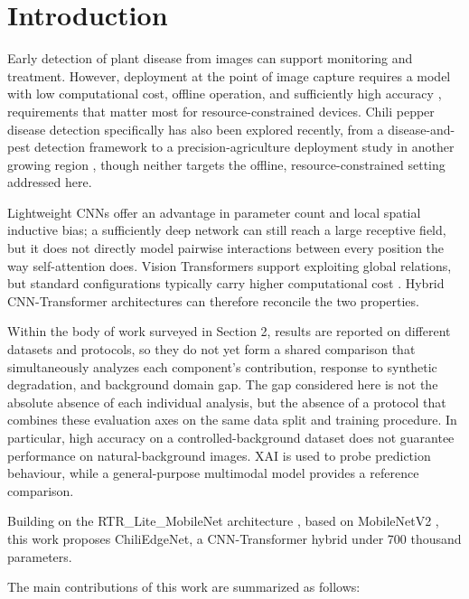 \FloatBarrier

\section{Introduction}\label{introduction}

Early detection of plant disease from images can support monitoring and treatment. However, deployment at the point of image capture requires a model with low computational cost, offline operation, and sufficiently high accuracy \cite{joseph2024,maurya2024,duhan2025}, requirements that matter most for resource-constrained devices. Chili pepper disease detection specifically has also been explored recently, from a disease-and-pest detection framework \cite{kanaparthi2026} to a precision-agriculture deployment study in another growing region \cite{odounfa2025}, though neither targets the offline, resource-constrained setting addressed here.

Lightweight CNNs offer an advantage in parameter count and local spatial inductive bias; a sufficiently deep network can still reach a large receptive field, but it does not directly model pairwise interactions between every position the way self-attention does. Vision Transformers support exploiting global relations, but standard configurations typically carry higher computational cost \cite{gole2023,li2023}. Hybrid CNN-Transformer architectures can therefore reconcile the two properties.

Within the body of work surveyed in Section 2, results are reported on different datasets and protocols, so they do not yet form a shared comparison that simultaneously analyzes each component's contribution, response to synthetic degradation, and background domain gap. The gap considered here is not the absolute absence of each individual analysis, but the absence of a protocol that combines these evaluation axes on the same data split and training procedure. In particular, high accuracy on a controlled-background dataset does not guarantee performance on natural-background images. XAI is used to probe prediction behaviour, while a general-purpose multimodal model provides a reference comparison.

Building on the RTR\_Lite\_MobileNet architecture \cite{duhan2025}, based on MobileNetV2 \cite{sandler2018}, this work proposes ChiliEdgeNet, a CNN-Transformer hybrid under 700 thousand parameters.

The main contributions of this work are summarized as follows:

